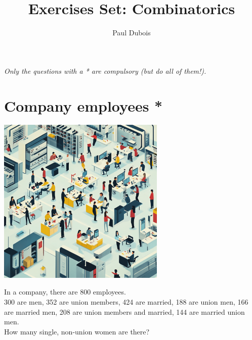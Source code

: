 \documentclass[]{article}
\title{Exercises Set: Combinatorics}
\author{Paul Dubois}
\date{}
\begin{document}
	
	\maketitle
	
	\begin{center}
		\textit{Only the questions with a * are compulsory (but do all of them!).}
	\end{center}
	
	\section{Company employees *}
	\begin{center}
		\includegraphics[height=8cm]{company.png}
	\end{center}
	In a company, there are 800 employees.\\
	300 are men, 352 are union members, 424 are married, 188 are union men, 166 are married men, 208 are union members and married, 144 are married union men.\\
	How many single, non-union women are there?
	
	\newpage
\end{document}
